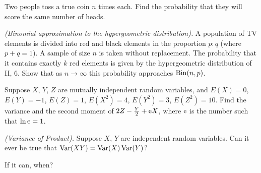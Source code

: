 \begin{problem}[Handout 8, \# 15]
  Two people toss a true coin \(n\) times each. Find the probability that
  they will score the same number of heads.
\end{problem}
\begin{solution}
\end{solution}

\begin{problem}[Handout 8, \# 16]
  \emph{(Binomial approximation to the hypergeometric distribution).} A
  population of TV elements is divided into red and black elements in the
  proportion \(p:q\) (where \(p+q=1\)). A sample of size \(n\) is taken
  without replacement. The probability that it contains exactly \(k\) red
  elements is given by the hypergeometric distribution of II, 6. Show that
  as \(n\to\infty\) this probability approaches \(\operatorname{Bin}(n,p)\).
\end{problem}
\begin{solution}
\end{solution}

\begin{problem}[Handout 9, \# 3]
  Suppose \(X\), \(Y\), \(Z\) are mutually independent random variables,
  and \(E(X)=0\), \(E(Y)=-1\), \(E(Z)=1\), \(E(X^2)=4\), \(E(Y^2)=3\),
  \(E(Z^2)=10\). Find the variance and the second moment of
  \(2Z-\frac{Y}{2}+\mathrm{e} X\), where \(\mathrm{e}\) is the number such that
  \(\ln \mathrm{e}=1\).
\end{problem}
\begin{solution}
\end{solution}

\begin{problem}[Handout 9, \# 14]
  \emph{(Variance of Product).} Suppose \(X\), \(Y\) are independent
  random variables. Can it ever be true that \(\operatorname{Var}(XY)=\operatorname{Var}(X)\operatorname{Var}(Y)\)?

  \noindent If it can, when?
\end{problem}
\begin{solution}
\end{solution}

